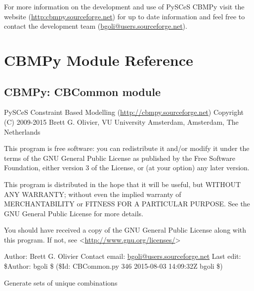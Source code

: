 \documentclass[a4paper,11pt,english]{sphinxmanual}
\begin{document}
For more information on the development and use of PySCeS CBMPy visit the website (\href{http:cbmpy.sourceforge.net}{http:cbmpy.sourceforge.net}) for up to date information and
feel free to contact the development team (\href{mailto:bgoli@users.sourceforge.net}{bgoli@users.sourceforge.net}).


\chapter{CBMPy Module Reference}
\label{modules_doc:cbmpy-module-reference}\label{modules_doc:module-cbmpy.CBCommon}\label{modules_doc::doc}

\section{CBMPy: CBCommon module}
\label{modules_doc:cbmpy-cbcommon-module}
PySCeS Constraint Based Modelling (\href{http://cbmpy.sourceforge.net}{http://cbmpy.sourceforge.net})
Copyright (C) 2009-2015 Brett G. Olivier, VU University Amsterdam, Amsterdam, The Netherlands

This program is free software: you can redistribute it and/or modify
it under the terms of the GNU General Public License as published by
the Free Software Foundation, either version 3 of the License, or
(at your option) any later version.

This program is distributed in the hope that it will be useful,
but WITHOUT ANY WARRANTY; without even the implied warranty of
MERCHANTABILITY or FITNESS FOR A PARTICULAR PURPOSE.  See the
GNU General Public License for more details.

You should have received a copy of the GNU General Public License
along with this program.  If not, see \textless{}\href{http://www.gnu.org/licenses/}{http://www.gnu.org/licenses/}\textgreater{}

Author: Brett G. Olivier
Contact email: \href{mailto:bgoli@users.sourceforge.net}{bgoli@users.sourceforge.net}
Last edit: \$Author: bgoli \$ (\$Id: CBCommon.py 346 2015-08-03 14:09:32Z bgoli \$)

\begin{fulllineitems}
\label{modules_doc:cbmpy.CBCommon.ComboGen}
Generate sets of unique combinations

\end{fulllineitems}
\end{document}
